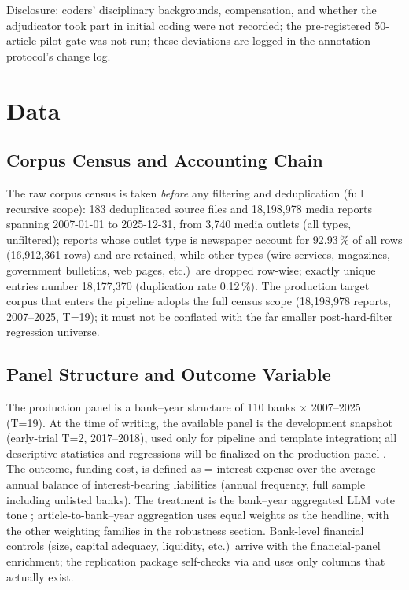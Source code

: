 Disclosure: coders' disciplinary backgrounds, compensation, and whether the
adjudicator took part in initial coding were not recorded; the
pre-registered 50-article pilot gate was not run; these deviations are
logged in the annotation protocol's change log.

\section{Data}\label{sec:data}

\subsection{Corpus Census and Accounting Chain}
The raw corpus census is taken \emph{before} any filtering and
deduplication (full recursive scope): 183 deduplicated source files
and 18{,}198{,}978 media reports spanning 2007-01-01 to 2025-12-31,
from 3{,}740 media outlets (all types, unfiltered); reports whose
outlet type is newspaper account for 92.93\,\% of all rows
(16{,}912{,}361 rows) and are retained, while other types (wire
services, magazines, government bulletins, web pages, etc.)\ are
dropped row-wise; exactly unique entries number 18{,}177{,}370
(duplication rate 0.12\,\%). The production target corpus that
enters the pipeline adopts the full census scope (18{,}198{,}978
reports, 2007--2025, T=19); it must not be conflated with the far
smaller post-hard-filter regression universe.

\subsection{Panel Structure and Outcome Variable}
The production panel is a bank--year structure of 110 banks $\times$
2007--2025 (T=19). At the time of writing, the available panel is the
development snapshot (early-trial T=2, 2017--2018), used only for pipeline and
template integration; all descriptive statistics and regressions will
be finalized on the production panel
.
The outcome, funding cost, is defined as  =
interest expense over the average annual balance of interest-bearing
liabilities (annual frequency, full sample including unlisted banks).
The treatment is the bank--year aggregated LLM vote tone
; article-to-bank--year aggregation uses
equal weights as the headline, with the other weighting families in
the robustness section. Bank-level financial controls (size, capital
adequacy, liquidity, etc.)\ arrive with the financial-panel
enrichment; the replication package self-checks via
 and uses only columns that actually exist.

